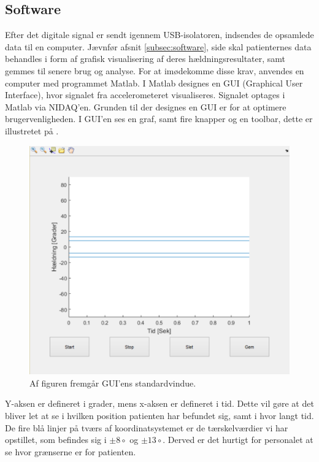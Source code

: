 \subsection{Software}
Efter det digitale signal er sendt igennem USB-isolatoren, indsendes de opsamlede data til en computer. Jævnfør afsnit \ref{subsec:software}, side \pageref{subsec:software} skal patienternes data behandles i form af grafisk visualisering af deres hældningsresultater, samt gemmes til senere brug og analyse. For at imødekomme disse krav, anvendes en computer med programmet Matlab. I Matlab designes en GUI (Graphical User Interface), hvor signalet fra accelerometeret visualiseres. Signalet optages i Matlab via NIDAQ'en. Grunden til der designes en GUI er for at optimere brugervenligheden. I GUI'en ses en graf, samt fire knapper og en toolbar, dette er illustretet på . 
\begin{figure}[H] 
	\centering 
	\includegraphics[scale=0.5]{figures/cProblemloesning/GUI_generisk.PNG}
	\caption{Af figuren fremgår GUI'ens standardvindue.}
	\label{Fig:GUI_generisk}
\end{figure} 
Y-aksen er defineret i grader, mens x-aksen er defineret i tid. Dette vil gøre at det bliver let at se i hvilken position patienten har befundet sig, samt i hvor langt tid.
De fire blå linjer på tværs af koordinatsystemet er de tærskelværdier vi har opstillet, som befindes sig i $\pm 8\circ$ og $\pm 13\circ$. Derved er det hurtigt for personalet at se hvor grænserne er for patienten.

